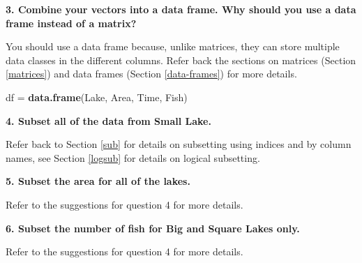 \documentclass[]{book}
\newenvironment{Shaded}{\begin{snugshade}}{\end{snugshade}}
\newcommand{\KeywordTok}[1]{\textcolor[rgb]{0.13,0.29,0.53}{\textbf{#1}}}
\newcommand{\DecValTok}[1]{\textcolor[rgb]{0.00,0.00,0.81}{#1}}
\newcommand{\StringTok}[1]{\textcolor[rgb]{0.31,0.60,0.02}{#1}}
\newcommand{\CommentTok}[1]{\textcolor[rgb]{0.56,0.35,0.01}{\textit{#1}}}
\newcommand{\OperatorTok}[1]{\textcolor[rgb]{0.81,0.36,0.00}{\textbf{#1}}}
\newcommand{\NormalTok}[1]{#1}
\theoremstyle{definition}
\theoremstyle{definition}
\theoremstyle{definition}
\theoremstyle{remark}
\begin{document}
\textbf{3. Combine your vectors into a data frame. Why should you use a
data frame instead of a matrix?}

You should use a data frame because, unlike matrices, they can store
multiple data classes in the different columns. Refer back the sections
on matrices (Section \ref{matrices}) and data frames (Section
\ref{data-frames}) for more details.

\begin{Shaded}
\begin{Highlighting}[]
\NormalTok{df =}\StringTok{ }\KeywordTok{data.frame}\NormalTok{(Lake, Area, Time, Fish)}
\end{Highlighting}
\end{Shaded}

\textbf{4. Subset all of the data from Small Lake.}

Refer back to Section \ref{sub} for details on subsetting using indices
and by column names, see Section \ref{logsub} for details on logical
subsetting.

\begin{Shaded}
\end{Shaded}

\textbf{5. Subset the area for all of the lakes.}

Refer to the suggestions for question 4 for more details.

\begin{Shaded}
\end{Shaded}

\textbf{6. Subset the number of fish for Big and Square Lakes only.}

Refer to the suggestions for question 4 for more details.

\begin{Shaded}
\end{Shaded}
\end{document}
